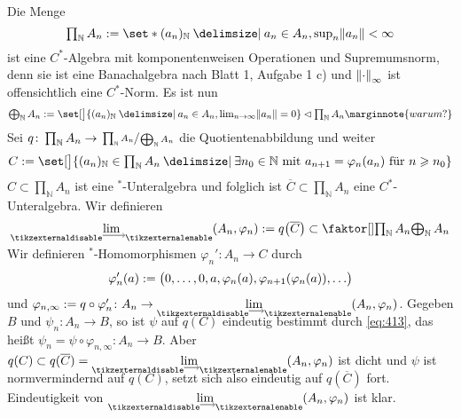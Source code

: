 \begin{beweis}
	Die Menge
	\[
		\textstyle\prod_\mathbb{N} A_n := \set*{(a_n)_\mathbb{N} \given a_n \in A_n, \sup_n \norm*{a_n} < \infty}
	\]
	ist eine $C^*$-Algebra mit komponentenweisen Operationen und Supremumsnorm, denn sie ist eine Banachalgebra nach Blatt 1, Aufgabe 1 c) und $\norm*{\cdot}_\infty$ ist offensichtlich eine $C^*$-Norm.
	Es ist nun
	\[
		\textstyle\bigoplus_\mathbb{N} A_n := \set[\big]{(a_n)_\mathbb{N} \given a_n \in A_n , \lim_{n \to \infty} \norm*{a_n}=0} \lhd \prod_\mathbb{N} A_n \marginnote{warum?}
	\]
	Sei $q \colon \prod_\mathbb{N} A_n \to \sfrac{\prod_\mathbb{N} A_n}{\bigoplus_\mathbb{N} A_n}$ die Quotientenabbildung und weiter
	\[
		\textstyle C := \set[\big]{(a_n)_\mathbb{N} \in \prod\nolimits_\mathbb{N} A_n \given  \exists n_0 \in \mathbb{N} \text{ mit } a_{n+1}= \varphi_n(a_n) \text{ für } n \ge n_0}
	\]
	$C \subset \prod_\mathbb{N} A_n$ ist eine $^*$-Unteralgebra und folglich ist $\overline{C} \subset \prod_\mathbb{N} A_n$ eine $C^*$-Unteralgebra.
	Wir definieren 
	\[
		\Dlim(A_n,\varphi_n) := q \enbrace*{\overline{C}} \subset \Faktor{\prod\nolimits_\mathbb{N} A_n}{\bigoplus\nolimits_\mathbb{N} A_n}
	\]
	Wir definieren $^*$-Homomorphismen $\varphi_n' \colon A_n \to C$ durch 
	\[
		\varphi_n'(a) := \enbrace[\big]{0, \ldots ,0,a,\varphi_n(a), \varphi_{n+1}(\varphi_n(a)),\ldots } 
	\]
	und $\varphi_{n,\infty} := q \circ \varphi_n' \colon A_n \to \Dlim(A_n,\varphi_n)$. 
	Gegeben $B$ und $\psi_n \colon A_n \to B$, so ist $\psi$ auf $q(C)$ eindeutig bestimmt durch \eqref{eq:413}, das heißt $\psi_n = \psi \circ \varphi_{n,\infty} \colon A_n \to B$.
	Aber $q(C) \subset q(\overline{C})= \Dlim(A_n,\varphi_n)$ ist dicht und $\psi$ ist normvermindernd auf $q(C)$, setzt sich also eindeutig auf $q(\overline{C})$ fort.
	Eindeutigkeit von $\Dlim (A_n,\varphi_n)$ ist klar.
\end{beweis}

